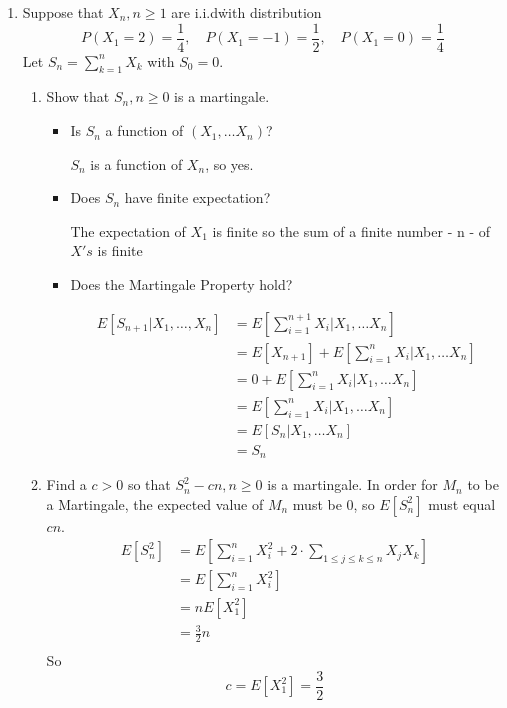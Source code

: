 \documentclass{article} %
\theoremstyle{plain}
\theoremstyle{case}
\begin{document}
\begin{enumerate}[label={\fbox{\textbf{Exercise \#\arabic* :}}}]
\newpage
  \item Suppose that $X_n, n \geq 1$ are i.i.d\. with distribution
    \[ P\left(X_1=2\right)=\frac{1}{4}, \quad P\left(X_1=-1\right)=\frac{1}{2}, \quad P\left(X_1=0\right)=\frac{1}{4} \]
Let $S_n=\sum_{k=1}^n X_k$ with $S_0=0$.
  \begin{enumerate}
    \item  Show that $S_n, n \geq 0$ is a martingale.
    \begin{itemize}
      \item Is $S_n$ a function of $(X_1, \dots X_n)$?

        $S_n$ is a function of $X_n$, so yes.
      \item Does $S_n$ have finite expectation?

        The expectation of $X_1$ is finite so the sum
        of a finite number - n - of $X's$ is finite
      \item Does the Martingale Property hold?

        \begin{align*}
          E[S_{n+1} | X_1, \dots, X_n] &= E[\sum^{n+1}_{i=1} X_i
                    | X_1, \dots X_n ]\\
                &= E[X_{n+1}] + E[\sum^{n}_{i=1} X_i
                    | X_1, \dots X_n ]\\
                &= 0 + E[\sum^{n}_{i=1} X_i
                    | X_1, \dots X_n ]\\
                &= E[\sum^{n}_{i=1} X_i
                    | X_1, \dots X_n ]\\
                &= E[S_n | X_1, \dots X_n ]\\
                &= S_n
        \end{align*}
    \end{itemize}
    \item  Find a $c>0$ so that $S_n^2-c n, n \geq 0$ is a martingale.
      In order for $M_n$ to be a Martingale, the expected value
      of $M_n$ must be 0, so $E[S_n^2]$ must equal $cn$.
      \begin{align*}
        E[S^2_n] &= E \left[ \sum^{n}_{i=1} X_i^2 + 2 \cdot \sum^{}_{1 \leq j \leq k \leq n} X_jX_k \right] \\
            &=E \left[ \sum^{n}_{i=1} X_i^2 \right] \\
            &= n E \left[ X_1^2 \right] \\
            &= \frac{3}{2} n \\
      \end{align*}
      So 
      \[ c = E[X_1^2] = \frac{3}{2}  \]


\end{enumerate}
\end{enumerate}
\end{document}
